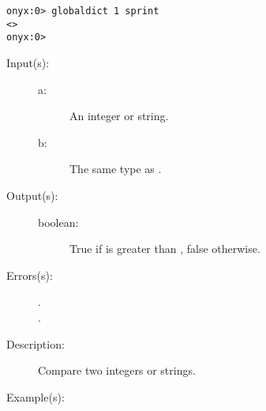 \begin{description}
\begin{description}
\begin{verbatim}
onyx:0> globaldict 1 sprint
<>
onyx:0>
		\end{verbatim}
	\end{description}
\label{systemdict:gt}
\item[{\onyxop{a b}{gt}{boolean}}: ]
	\begin{description}\item[]
	\item[Input(s): ]
		\begin{description}\item[]
		\item[a: ]
			An integer or string.
		\item[b: ]
			The same type as .
		\end{description}
	\item[Output(s): ]
		\begin{description}\item[]
		\item[boolean: ]
			True if  is greater than , false
			otherwise.
		\end{description}
	\item[Errors(s): ]
		\begin{description}\item[]
		\item[.]
		\item[.]
		\end{description}
	\item[Description: ]
		Compare two integers or strings.
	\item[Example(s): ]\begin{verbatim}


\end{verbatim}
\end{description}
\end{description}
